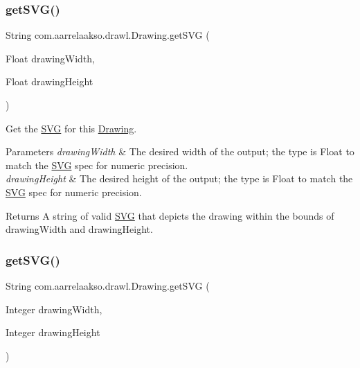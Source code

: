 \subsubsection{\texorpdfstring{get\+S\+V\+G()}{getSVG()}\hspace{0.1cm}{\footnotesize\ttfamily [1/3]}}
{\footnotesize\ttfamily String com.\+aarrelaakso.\+drawl.\+Drawing.\+get\+S\+VG (\begin{DoxyParamCaption}\item[{Float}]{drawing\+Width,  }\item[{Float}]{drawing\+Height }\end{DoxyParamCaption})}



Get the \hyperlink{classcom_1_1aarrelaakso_1_1drawl_1_1_s_v_g}{S\+VG} for this \hyperlink{classcom_1_1aarrelaakso_1_1drawl_1_1_drawing}{Drawing}. 


\begin{DoxyParams}{Parameters}
{\em drawing\+Width} & The desired width of the output; the type is Float to match the \hyperlink{classcom_1_1aarrelaakso_1_1drawl_1_1_s_v_g}{S\+VG} spec for numeric precision. \\
\hline
{\em drawing\+Height} & The desired height of the output; the type is Float to match the \hyperlink{classcom_1_1aarrelaakso_1_1drawl_1_1_s_v_g}{S\+VG} spec for numeric precision. \\
\hline
\end{DoxyParams}
\begin{DoxyReturn}{Returns}
A string of valid \hyperlink{classcom_1_1aarrelaakso_1_1drawl_1_1_s_v_g}{S\+VG} that depicts the drawing within the bounds of drawing\+Width and drawing\+Height. 
\end{DoxyReturn}
\mbox{\label{classcom_1_1aarrelaakso_1_1drawl_1_1_drawing_af9e3b649e8088e4ba3c6377f3eddf452}} 
\subsubsection{\texorpdfstring{get\+S\+V\+G()}{getSVG()}\hspace{0.1cm}{\footnotesize\ttfamily [2/3]}}
{\footnotesize\ttfamily String com.\+aarrelaakso.\+drawl.\+Drawing.\+get\+S\+VG (\begin{DoxyParamCaption}\item[{Integer}]{drawing\+Width,  }\item[{Integer}]{drawing\+Height }\end{DoxyParamCaption})}



